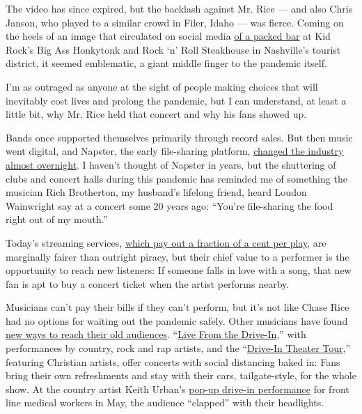 The video has since expired, but the backlash against Mr. Rice --- and
also Chris Janson, who played to a similar crowd in Filer, Idaho --- was
fierce. Coming on the heels of an image that circulated on social media
\href{https://twitter.com/MissMandyHale/status/1272231947708891144}{of a
packed bar} at Kid Rock's Big Ass Honkytonk and Rock `n' Roll Steakhouse
in Nashville's tourist district, it seemed emblematic, a giant middle
finger to the pandemic itself.

I'm as outraged as anyone at the sight of people making choices that
will inevitably cost lives and prolong the pandemic, but I can
understand, at least a little bit, why Mr. Rice held that concert and
why his fans showed up.

Bands once supported themselves primarily through record sales. But then
music went digital, and Napster, the early file-sharing platform,
\href{https://www.nytimes.com/2000/07/15/opinion/freedom-one-song-at-a-time.html?searchResultPosition=2}{changed
the industry almost overnight}. I haven't thought of Napster in years,
but the shuttering of clubs and concert halls during this pandemic has
reminded me of something the musician Rich Brotherton, my husband's
lifelong friend, heard Loudon Wainwright say at a concert some 20 years
ago: ``You're file-sharing the food right out of my mouth.''

Today's streaming services,
\href{https://www.rollingstone.com/pro/features/how-musicians-make-money-or-dont-at-all-in-2018-706745/}{which
pay out a fraction of a cent per play}, are marginally fairer than
outright piracy, but their chief value to a performer is the opportunity
to reach new listeners: If someone falls in love with a song, that new
fan is apt to buy a concert ticket when the artist performs nearby.

Musicians can't pay their bills if they can't perform, but it's not like
Chase Rice had no options for waiting out the pandemic safely. Other
musicians have found
\href{https://www.vulture.com/2020/05/all-musicians-streaming-live-concerts.html}{new
ways to reach their old audiences}.
``\href{http://www.livenation.com/drivein/}{Live From the Drive-In},''
with performances by country, rock and rap artists, and the
``\href{https://www.driveintheatertour.com/}{Drive-In Theater Tour},''
featuring Christian artists, offer concerts with social distancing baked
in: Fans bring their own refreshments and stay with their cars,
tailgate-style, for the whole show. At the country artist Keith Urban's
\href{https://www.tennessean.com/story/entertainment/music/2020/05/15/keith-urban-drive-concert-stardust-vanderbilt-medical-workers-tennessee/5196898002/}{pop-up
drive-in performance} for front line medical workers in May, the
audience ``clapped'' with their headlights.

